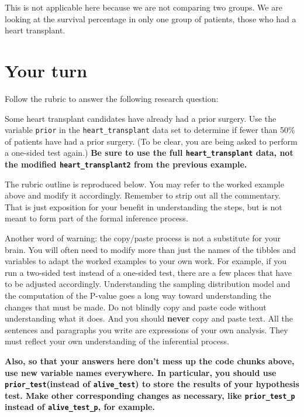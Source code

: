 \documentclass[
]{book}
\begin{document}
This is not applicable here because we are not comparing two groups. We are looking at the survival percentage in only one group of patients, those who had a heart transplant.

\hypertarget{one-prop-your-turn}{%
\section{Your turn}\label{one-prop-your-turn}}

Follow the rubric to answer the following research question:

Some heart transplant candidates have already had a prior surgery. Use the variable \texttt{prior} in the \texttt{heart\_transplant} data set to determine if fewer than 50\% of patients have had a prior surgery. (To be clear, you are being asked to perform a one-sided test again.) \textbf{Be sure to use the full \texttt{heart\_transplant} data, not the modified \texttt{heart\_transplant2} from the previous example.}

The rubric outline is reproduced below. You may refer to the worked example above and modify it accordingly. Remember to strip out all the commentary. That is just exposition for your benefit in understanding the steps, but is not meant to form part of the formal inference process.

Another word of warning: the copy/paste process is not a substitute for your brain. You will often need to modify more than just the names of the tibbles and variables to adapt the worked examples to your own work. For example, if you run a two-sided test instead of a one-sided test, there are a few places that have to be adjusted accordingly. Understanding the sampling distribution model and the computation of the P-value goes a long way toward understanding the changes that must be made. Do not blindly copy and paste code without understanding what it does. And you should \textbf{never} copy and paste text. All the sentences and paragraphs you write are expressions of your own analysis. They must reflect your own understanding of the inferential process.

\textbf{Also, so that your answers here don't mess up the code chunks above, use new variable names everywhere. In particular, you should use \texttt{prior\_test}(instead of \texttt{alive\_test}) to store the results of your hypothesis test. Make other corresponding changes as necessary, like \texttt{prior\_test\_p} instead of \texttt{alive\_test\_p}, for example.}
\end{document}
